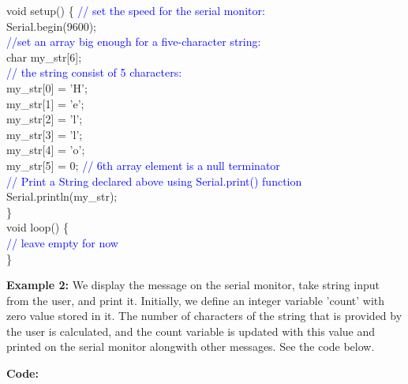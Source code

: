 \documentclass[12pt,a4paper]{article}
\begin{document}
void setup() \{
   \textcolor{blue}{// set the speed for the serial monitor:}\\
 Serial.begin(9600);\\
 \textcolor{blue}{//set an array big enough for a five-character string:}\\
 char my\_str[6];\\    
  \textcolor{blue}{// the string consist of 5 characters:}\\
  my\_str[0] = 'H';  \\
  my\_str[1] = 'e';\\
  my\_str[2] = 'l';\\
  my\_str[3] = 'l';\\
  my\_str[4] = 'o';\\
  my\_str[5] = 0; \textcolor{blue}{ // 6th array element is a null terminator}\\
 \textcolor{blue}{// Print a String declared above using Serial.print() function}\\
  Serial.println(my\_str);\\
 \}\\
 void loop() \{\\
  \textcolor{blue}{// leave empty for now}\\
 \}\\

\setlength{\parindent}{0eM}
\begin{justify}
\noindent \textbf{Example 2:} We display the message on the serial monitor, take string input from the user, and print it. Initially, we define an integer variable 'count' with zero value stored in it. The number of characters of the string that is provided by the user is calculated, and the count variable is updated with this value and printed on the serial monitor alongwith other messages. See the code below.\end{justify}
\vspace{-5mm}
\hspace{1.5cm}\textbf{\large Code:}\\[6pt]
\setlength{\parindent}{8eM}
\end{document}
